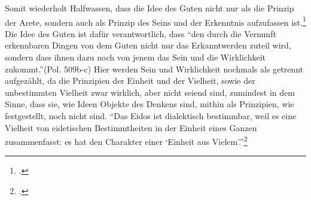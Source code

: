 Somit wiederholt Halfwassen, dass die Idee des Guten nicht nur als die Prinzip der Arete, sondern auch als Prinzip des Seins und der Erkenntnis aufzufassen ist.\footcite[vgl.][S. 238]{halfwassenaufstieg2006}
Die Idee des Guten ist dafür verantwortlich, dass \enquote{den durch die Vernunft erkennbaren Dingen von dem Guten nicht nur das Erkanntwerden zuteil wird, sondern dass ihnen dazu noch von jenem das Sein und die Wirklichkeit zukommt.}(Pol. 509b-c) 
Hier werden Sein und Wirklichkeit nochmals als getrennt aufgezählt, da die Prinzipien der Einheit und der Vielheit, sowie der unbestimmten Vielheit zwar wirklich, aber nicht seiend sind, zumindest in dem Sinne, dass sie, wie Ideen Objekte des Denkens sind, mithin als Prinzipien, wie festgestellt, noch nicht sind.
\enquote{Das Eidos ist dialektisch bestimmbar, weil es eine Vielheit von eidetischen Bestimmtheiten in der Einheit eines Ganzen zusammenfasst: es hat den Charakter einer \enquote{Einheit aus Vielem}.}\footcite[][S. 240]{halfwassenaufstieg2006}

